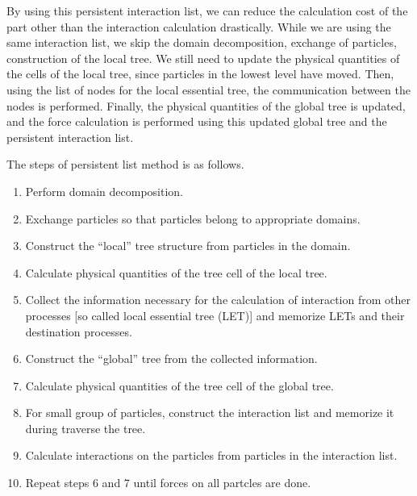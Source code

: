 \documentclass[oribibl]{llncs}
\begin{document}
By using this persistent interaction list, we can reduce the
calculation cost of the part other than the interaction calculation
drastically. While we are using the same interaction list, we skip the
domain decomposition, exchange of particles, construction of the local
tree. We still need to update the physical quantities of the cells of
the local tree, since particles in the lowest level have moved. Then,
using the list of nodes for the local essential tree, the
communication between the nodes is performed. Finally, the physical
quantities of the global tree is updated, and the force calculation is
performed using this updated global tree and the persistent
interaction list.

The steps of persistent list method is as follows.

\begin{enumerate}

\item Perform domain decomposition. \label{enum:1st_step_beg}
  
\item Exchange particles so that particles belong to appropriate
  domains.
  
\item Construct the ``local'' tree structure from particles in the
  domain.

\item Calculate physical quantities of the tree cell of the local
  tree.
  
\item Collect the information necessary for the calculation of
  interaction from other processes [so called local essential tree
    (LET)] and memorize LETs and their destination
  processes. \label{enum:LET}
    
\item Construct the ``global'' tree from the collected information.

\item Calculate physical quantities of the tree cell of the global tree.
  
\item For small group of particles, construct the interaction list and
  memorize it during traverse the tree.
  
\item Calculate interactions on the particles from particles in the
  interaction list.

\item Repeat steps 6 and 7 until forces on all partcles are done.
  

\end{enumerate}
\end{document}
